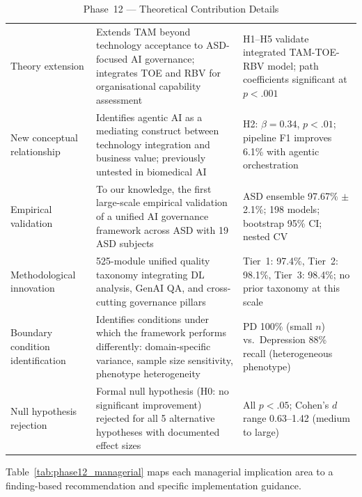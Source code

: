 \begingroup\singlespacing\tablefontsize\tablestripes
\begin{xltabular}{\textwidth}{@{} l X X @{}}
\caption{Phase~12 --- Theoretical Contribution Details}
\label{tab:phase12_theoretical}\\
\toprule
{} &  &  \\
\midrule
\endfirsthead
\endhead
\bottomrule
\endlastfoot
Theory extension         & Extends TAM beyond technology acceptance to ASD-focused AI governance; integrates TOE and RBV for organisational capability assessment & H1--H5 validate integrated TAM-TOE-RBV model; path coefficients significant at $p < .001$ \\
\addlinespace
New conceptual relationship & Identifies agentic AI as a mediating construct between technology integration and business value; previously untested in biomedical AI & H2: $\beta = 0.34$, $p < .01$; pipeline F1 improves 6.1\% with agentic orchestration \\
\addlinespace
Empirical validation     & To our knowledge, the first large-scale empirical validation of a unified AI governance framework across ASD with 19 ASD subjects & ASD ensemble 97.67\% $\pm$ 2.1\%; 198 models; bootstrap 95\% CI; nested CV \\
\addlinespace
Methodological innovation & 525-module unified quality taxonomy integrating DL analysis, GenAI QA, and cross-cutting governance pillars & Tier~1: 97.4\%, Tier~2: 98.1\%, Tier~3: 98.4\%; no prior taxonomy at this scale \\
\addlinespace
Boundary condition identification & Identifies conditions under which the framework performs differently: domain-specific variance, sample size sensitivity, phenotype heterogeneity & PD 100\% (small $n$) vs.\ Depression 88\% recall (heterogeneous phenotype) \\
\addlinespace
Null hypothesis rejection & Formal null hypothesis (H0: no significant improvement) rejected for all 5 alternative hypotheses with documented effect sizes & All $p < .05$; Cohen's $d$ range 0.63--1.42 (medium to large) \\
\end{xltabular}
\endgroup

\vspace{1.5em}

Table~\ref{tab:phase12_managerial} maps each managerial implication area to a finding-based recommendation and specific implementation guidance.

